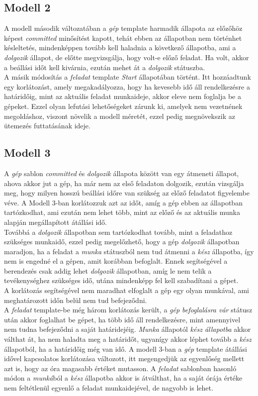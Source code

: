 \documentclass {report}
\begin{document}
\subsection{Modell 2}
A modell második változatában a \emph{gép} template harmadik állapota az előzőhöz képest \emph{committed} minősítést kapott, tehát ebben az állapotban nem történhet késleltetés, mindenképpen tovább kell haladnia a következő állapotba, ami a \emph{dolgozik} állapot, de előtte megvizsgálja, hogy volt-e előző feladat. Ha volt, akkor a beállási időt kell kivárnia, ezután mehet át a \emph{dolgozik} státuszba.\\
A másik módosítás a \emph{feladat} template \emph{Start} állapotában történt. Itt hozzáadtunk egy korlátozást, amely megakadályozza, hogy ha kevesebb idő áll rendelkezésre a határidőig, mint az aktuális feladat munkaideje, akkor eleve nem foglalja be a gépeket. Ezzel olyan lefutási lehetőségeket zárunk ki, amelyek nem vezetnének megoldáshoz, viszont növelik a modell méretét, ezzel pedig megnövekszik az ütemezés futtatásának ideje.
\subsection{Modell 3}
A \emph{gép} sablon \emph{committed} és \emph{dolgozik} állapota között van egy átmeneti állapot, ahova akkor jut a gép, ha már nem az első feladaton dolgozik, ezután vizsgálja meg, hogy milyen hosszú beállási időre van szükség az előző feladatot figyelembe véve. A Modell 3-ban korlátozzuk azt az időt, amíg a gép ebben az állapotban tartózkodhat, ami ezután nem lehet több, mint az előző és az aktuális munka alapján megállapított átállási idő. \\
Továbbá a \emph{dolgozik} állapotban sem tartózkodhat tovább, mint a feladathoz szükséges munkaidő, ezzel pedig megelőzhető, hogy a gép \emph{dolgozik} állapotban maradjon, ha a feladat a \emph{munka} státuszból nem tud átmenni a \emph{kész} állapotba, így nem is engedné el a gépen, amit korábban befoglalt. Ennek segítségével a berendezés csak addig lehet \emph{dolgozik} állapotban, amíg le nem telik a tevékenységhez szükséges idő, utána mindenképp fel kell szabadítani a gépet.\\
A korlátozás segítségével nem maradhat elfoglalt a gép egy olyan munkával, ami meghatározott időn belül nem tud befejeződni. \\
A \emph{feladat} template-be még három korlátozás került, a \emph{gép befoglalásra vár} státusz után akkor foglalhat be gépet, ha több idő áll rendelkezésre, mint amennyivel nem tudna befejeződni a saját határidejéig. \emph{Munka} állapotól \emph{kész állapotba} akkor válthat át, ha nem haladta meg a határidőt, ugyanígy akkor léphet tovább a \emph{kész} állapotból, ha a határidőig még van idő.
A modell 3-ban a \emph{gép} template átállási idővel kapcsolatos korlátozása változott, itt megengedjük az egyenlőség mellett azt is, hogy az óra magasabb értéket mutasson. A \emph{feladat} sablonban hasonló módon a \emph{munká}ból a \emph{kész} állapotba akkor is átválthat, ha a saját órája értéke nem feltétlenül egyenlő a feladat munkaidejével, de nagyobb is lehet.
\end{document}
